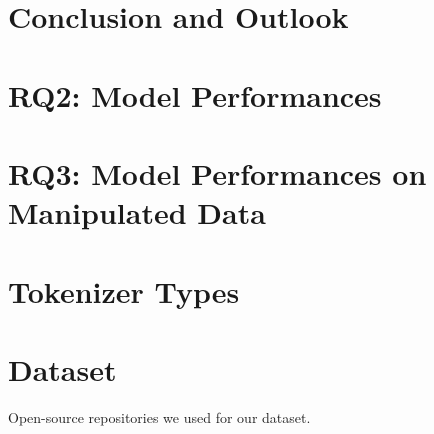 \documentclass[
     12pt,                    %
     a4paper,             %
     BCOR10mm,     %
     DIV14,                 %
     listof=totoc,                    %
     bibliography=totoc,       %
     index=totoc,              %
     twoside,
     headsepline
     ]{scrreprt}
\begin{document}
\chapter{Conclusion and Outlook}\label{chap:conclusion}


  

\clearpage




\appendix
\appendixpage
\addappheadtotoc
\setcounter{table}{0}
\renewcommand{\thetable}{A\arabic{table}}




\chapter*{RQ2: Model Performances}

\chapter*{RQ3: Model Performances on Manipulated Data}

\chapter*{Tokenizer Types}

\chapter*{Dataset}
\begin{table}[h]
     \footnotesize
     \caption{Open-source repositories we used for our dataset. }
     \label{tab:repos_hashes}
\end{table}
\end{document}

